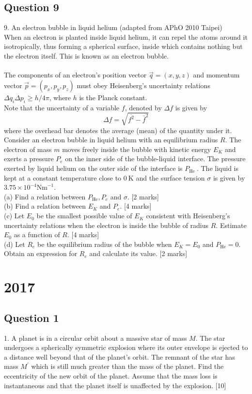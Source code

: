 \documentclass{article}
\begin{document}
\subsection{Question 9}
9. An electron bubble in liquid helium (adapted from APhO 2010 Taipei) \\
When an electron is planted inside liquid helium, it can repel the atoms around it isotropically, thus forming a spherical surface, inside which contains nothing but the electron itself. This is known as an electron bubble. \\
\\
The components of an electron's position vector $\vec{q}=(x, y, z)$ and momentum vector $\vec{p}=\left(p_{x}, p_{y}, p_{z}\right)$ must obey Heisenberg's uncertainty relations $\Delta q_{i} \Delta p_{i} \geq h / 4 \pi$, where $h$ is the Planck constant. \\
Note that the uncertainty of a variable $f$, denoted by $\Delta f$ is given by
$$
\Delta f=\sqrt{\overline{f^{2}}-\bar{f}^{2}}
$$
where the overhead bar denotes the average (mean) of the quantity under it. \\
Consider an electron bubble in liquid helium with an equilibrium radius $R$. The electron of mass $m$ moves freely inside the bubble with kinetic energy $E_{K}$ and exerts a pressure $P_{e}$ on the inner side of the bubble-liquid interface. The pressure exerted by liquid helium on the outer side of the interface is $P_{\text {He }}$. The liquid is kept at a constant temperature close to $0 \mathrm{~K}$ and the surface tension $\sigma$ is given by $3.75 \times 10^{-4} \mathrm{Nm}^{-1}$.  \\
(a) Find a relation between $P_{\mathrm{He}}, P_{e}$ and $\sigma$. [2 marks] \\
(b) Find a relation between $E_{K}$ and $P_{e}$. [4 marks] \\
(c) Let $E_{0}$ be the smallest possible value of $E_{K}$ consistent with Heisenberg's uncertainty relations when the electron is inside the bubble of radius $R$. Estimate $E_{0}$ as a function of $R$. [4 marks] \\
(d) Let $R_{e}$ be the equilibrium radius of the bubble when $E_{K}=E_{0}$ and $P_{\mathrm{He}}=0 .$ Obtain an expression for $R_{e}$ and calculate its value. [2 marks]



\section{2017}
\subsection{Question 1}
1. A planet is in a circular orbit about a massive star of mass $M$. The star undergoes a spherically symmetric explosion where its outer envelope is ejected to a distance well beyond that of the planet's orbit. The remnant of the star has mass $M^{\prime}$ which is still much greater than the mass of the planet. Find the eccentricity of the new orbit of the planet. Assume that the mass loss is instantaneous and that the planet itself is unaffected by the explosion. [10]
\end{document}

